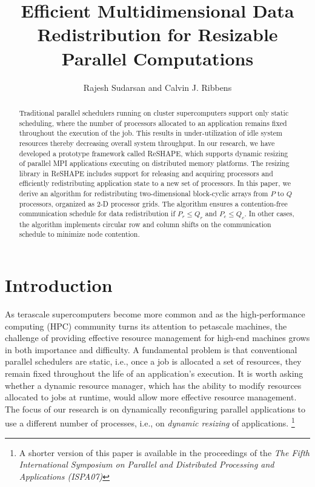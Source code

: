 \documentclass[letterpaper]{llncs}
\title{\bf Efficient Multidimensional Data Redistribution for Resizable Parallel Computations\\ 
}
\author{Rajesh Sudarsan and Calvin J. Ribbens}
\institute{Department of Computer Science\\
Virginia Tech, Blacksburg, VA 24061-0106 \\
\email{\{sudarsar, ribbens\}@vt.edu}}
\begin{document}
\maketitle
\thispagestyle{empty}
\begin{abstract}
Traditional parallel schedulers running on cluster supercomputers
support only static scheduling, where the number of processors
allocated to an application remains fixed throughout the  execution of the job.
This results in under-utilization of idle system resources 
thereby decreasing overall system throughput.
In our research, we have developed a
prototype framework called ReSHAPE, which supports dynamic resizing of
parallel MPI applications executing on distributed memory platforms.
The resizing library in ReSHAPE includes support for releasing and acquiring
processors and efficiently redistributing application state to a new
set of processors. In this paper, we derive an algorithm for redistributing
two-dimensional block-cyclic arrays from $P$ to $Q$ processors, organized
as 2-D processor grids. The algorithm ensures
a contention-free communication schedule for data redistribution
if $P_r \leq Q_r$ and $P_c \leq Q_c$.
In other cases, the algorithm implements
circular row and column shifts on the communication schedule
 to minimize node contention.
\end{abstract}


\section{Introduction}
As terascale supercomputers become more common and as the high-performance computing (HPC) community turns its attention to petascale machines, 
the challenge of providing effective resource management for high-end machines grows in both importance and difficulty. 
A fundamental problem is that conventional parallel schedulers are static, i.e., 
 once a job is allocated a set of resources, they remain fixed throughout the 
life of an application's execution.
It is worth asking whether a dynamic resource manager, which has the ability to 
modify resources allocated to jobs at runtime, would allow more effective resource 
management. The focus of our research is on dynamically reconfiguring parallel 
applications to use a different number of processes, i.e., on 
\textit{dynamic resizing} of applications.
\footnote{A shorter version of this paper is available in the proceedings of the \textit{The Fifth International Symposium on Parallel and Distributed Processing and Applications (ISPA07)}}
\end{document}

